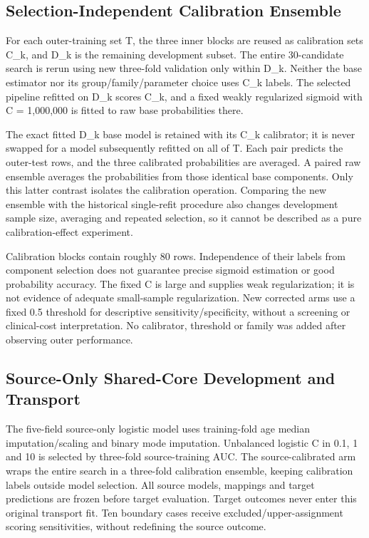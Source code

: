 \documentclass[conference,10pt]{IEEEtran}
\begin{document}
\subsection{Selection-Independent Calibration Ensemble}
For each outer-training set T, the three inner blocks are reused as calibration sets C\_k, and D\_k is the remaining development subset. The entire 30-candidate search is rerun using new three-fold validation only within D\_k. Neither the base estimator nor its group/family/parameter choice uses C\_k labels. The selected pipeline refitted on D\_k scores C\_k, and a fixed weakly regularized sigmoid with C = 1,000,000 is fitted to raw base probabilities there.

The exact fitted D\_k base model is retained with its C\_k calibrator; it is never swapped for a model subsequently refitted on all of T. Each pair predicts the outer-test rows, and the three calibrated probabilities are averaged. A paired raw ensemble averages the probabilities from those identical base components. Only this latter contrast isolates the calibration operation. Comparing the new ensemble with the historical single-refit procedure also changes development sample size, averaging and repeated selection, so it cannot be described as a pure calibration-effect experiment.

Calibration blocks contain roughly 80 rows. Independence of their labels from component selection does not guarantee precise sigmoid estimation or good probability accuracy. The fixed C is large and supplies weak regularization; it is not evidence of adequate small-sample regularization. New corrected arms use a fixed 0.5 threshold for descriptive sensitivity/specificity, without a screening or clinical-cost interpretation. No calibrator, threshold or family was added after observing outer performance.


\subsection{Source-Only Shared-Core Development and Transport}
The five-field source-only logistic model uses training-fold age median imputation/scaling and binary mode imputation. Unbalanced logistic C in 0.1, 1 and 10 is selected by three-fold source-training AUC. The source-calibrated arm wraps the entire search in a three-fold calibration ensemble, keeping calibration labels outside model selection. All source models, mappings and target predictions are frozen before target evaluation. Target outcomes never enter this original transport fit. Ten boundary cases receive excluded/upper-assignment scoring sensitivities, without redefining the source outcome.
\end{document}
